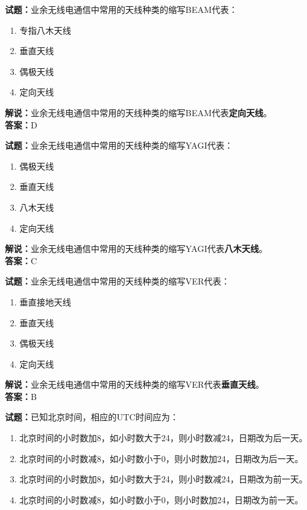 \documentclass{ctexbook}
\begin{document}
\bigskip


\noindent\textbf{试题：}业余无线电通信中常用的天线种类的缩写BEAM代表：

\begin{enumerate}[leftmargin=3em]
	\item 专指八木天线
	\item 垂直天线
	\item 偶极天线
	\item 定向天线
\end{enumerate}

\noindent\textbf{解说：}业余无线电通信中常用的天线种类的缩写BEAM代表\textbf{定向天线}。\\\noindent\textbf{答案：}D


\bigskip


\noindent\textbf{试题：}业余无线电通信中常用的天线种类的缩写YAGI代表：

\begin{enumerate}[leftmargin=3em]
	\item 偶极天线
	\item 垂直天线
	\item 八木天线
	\item 定向天线
\end{enumerate}

\noindent\textbf{解说：}业余无线电通信中常用的天线种类的缩写YAGI代表\textbf{八木天线}。\\\noindent\textbf{答案：}C


\bigskip


\noindent\textbf{试题：}业余无线电通信中常用的天线种类的缩写VER代表：

\begin{enumerate}[leftmargin=3em]
	\item 垂直接地天线
	\item 垂直天线
	\item 偶极天线
	\item 定向天线
\end{enumerate}

\noindent\textbf{解说：}业余无线电通信中常用的天线种类的缩写VER代表\textbf{垂直天线}。\\\noindent\textbf{答案：}B


\bigskip


\noindent\textbf{试题：}已知北京时间，相应的UTC时间应为：

\begin{enumerate}[leftmargin=3em]
	\item 北京时间的小时数加8，如小时数大于24，则小时数减24，日期改为后一天。
	\item 北京时间的小时数减8，如小时数小于0，则小时数加24，日期改为后一天。
	\item 北京时间的小时数加8，如小时数大于24，则小时数减24，日期改为前一天。
	\item 北京时间的小时数减8，如小时数小于0，则小时数加24，日期改为前一天。
\end{enumerate}
\end{document}

